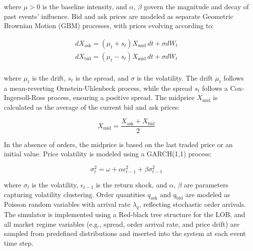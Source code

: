 \documentclass[11pt]{article}
\begin{document}
    where \( \mu > 0 \) is the baseline intensity, and \( \alpha \), \( \beta \) govern the magnitude and decay of past events' influence.
    Bid and ask prices are modeled as separate Geometric Brownian Motion (GBM) processes, with prices evolving according to:

    \begin{gather*}
        dX_{\text{ask}} = (\mu_t + s_t) X_{\text{mid}} \, dt + \sigma dW_t\\
        dX_{\text{bid}} = (\mu_t - s_t) X_{\text{mid}} \, dt + \sigma dW_t\\
    \end{gather*}

    where \( \mu_t \) is the drift, \( s_t \) is the spread, and \( \sigma \) is the volatility.
    The drift \( \mu_t \) follows a mean-reverting Ornstein-Uhlenbeck process, while the spread \( s_t \) follows a Cox-Ingersoll-Ross process,
    ensuring a positive spread.
    The midprice \( X_{\text{mid}} \) is calculated as the average of the current bid and ask prices:

    \[
        X_{\text{mid}} = \frac{X_{\text{ask}} + X_{\text{bid}}}{2}
    \]

    In the absence of orders, the midprice is based on the last traded price or an initial value.
    Price volatility is modeled using a GARCH(1,1) process:

    \[
        \sigma_t^2 = \omega + \alpha \epsilon_{t-1}^2 + \beta \sigma_{t-1}^2
    \]

    where \( \sigma_t \) is the volatility, \( \epsilon_{t-1} \) is the return shock, and \( \alpha \), \( \beta \) are parameters capturing volatility clustering.
    Order quantities \( q_{\text{ask}} \) and \( q_{\text{bid}} \) are modeled as Poisson random variables with arrival rate \( \lambda_q \),
    reflecting stochastic order arrivals.
    The simulator is implemented using a Red-black tree structure for the LOB, and all market regime variables (e.g., spread, order arrival rate, and price drift)
    are sampled from predefined distributions and inserted into the system at each event time step.
\end{document}
